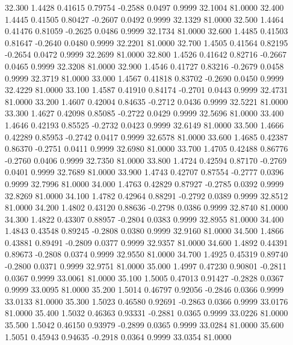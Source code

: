   32.300   1.4428   0.41615   0.79754  -0.2588   0.0497   0.9999  32.1004  81.0000
  32.400   1.4445   0.41505   0.80427  -0.2607   0.0492   0.9999  32.1329  81.0000
  32.500   1.4464   0.41476   0.81059  -0.2625   0.0486   0.9999  32.1734  81.0000
  32.600   1.4485   0.41503   0.81647  -0.2640   0.0480   0.9999  32.2201  81.0000
  32.700   1.4505   0.41564   0.82195  -0.2654   0.0472   0.9999  32.2699  81.0000
  32.800   1.4526   0.41642   0.82716  -0.2667   0.0465   0.9999  32.3208  81.0000
  32.900   1.4546   0.41727   0.83216  -0.2679   0.0458   0.9999  32.3719  81.0000
  33.000   1.4567   0.41818   0.83702  -0.2690   0.0450   0.9999  32.4229  81.0000
  33.100   1.4587   0.41910   0.84174  -0.2701   0.0443   0.9999  32.4731  81.0000
  33.200   1.4607   0.42004   0.84635  -0.2712   0.0436   0.9999  32.5221  81.0000
  33.300   1.4627   0.42098   0.85085  -0.2722   0.0429   0.9999  32.5696  81.0000
  33.400   1.4646   0.42193   0.85525  -0.2732   0.0423   0.9999  32.6149  81.0000
  33.500   1.4666   0.42289   0.85953  -0.2742   0.0417   0.9999  32.6578  81.0000
  33.600   1.4685   0.42387   0.86370  -0.2751   0.0411   0.9999  32.6980  81.0000
  33.700   1.4705   0.42488   0.86776  -0.2760   0.0406   0.9999  32.7350  81.0000
  33.800   1.4724   0.42594   0.87170  -0.2769   0.0401   0.9999  32.7689  81.0000
  33.900   1.4743   0.42707   0.87554  -0.2777   0.0396   0.9999  32.7996  81.0000
  34.000   1.4763   0.42829   0.87927  -0.2785   0.0392   0.9999  32.8269  81.0000
  34.100   1.4782   0.42964   0.88291  -0.2792   0.0389   0.9999  32.8512  81.0000
  34.200   1.4802   0.43120   0.88636  -0.2798   0.0386   0.9999  32.8740  81.0000
  34.300   1.4822   0.43307   0.88957  -0.2804   0.0383   0.9999  32.8955  81.0000
  34.400   1.4843   0.43548   0.89245  -0.2808   0.0380   0.9999  32.9160  81.0000
  34.500   1.4866   0.43881   0.89491  -0.2809   0.0377   0.9999  32.9357  81.0000
  34.600   1.4892   0.44391   0.89673  -0.2808   0.0374   0.9999  32.9550  81.0000
  34.700   1.4925   0.45319   0.89740  -0.2800   0.0371   0.9999  32.9751  81.0000
  35.000   1.4997   0.47230   0.90801  -0.2811   0.0367   0.9999  33.0061  81.0000
  35.100   1.5005   0.47013   0.91427  -0.2828   0.0367   0.9999  33.0095  81.0000
  35.200   1.5014   0.46797   0.92056  -0.2846   0.0366   0.9999  33.0133  81.0000
  35.300   1.5023   0.46580   0.92691  -0.2863   0.0366   0.9999  33.0176  81.0000
  35.400   1.5032   0.46363   0.93331  -0.2881   0.0365   0.9999  33.0226  81.0000
  35.500   1.5042   0.46150   0.93979  -0.2899   0.0365   0.9999  33.0284  81.0000
  35.600   1.5051   0.45943   0.94635  -0.2918   0.0364   0.9999  33.0354  81.0000
